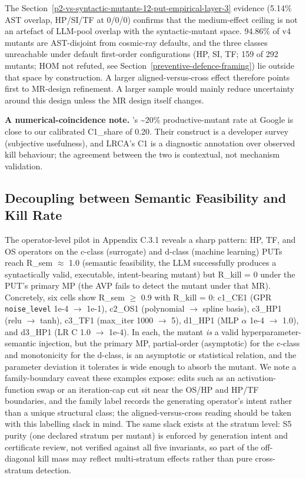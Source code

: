 \documentclass[manuscript,screen,review]{acmart}
\begin{document}
The Section~\ref{p2-vs-syntactic-mutants-12-put-empirical-layer-3} evidence (5.14\% AST overlap, HP/SI/TF at 0/0/0) confirms that
the medium-effect ceiling is not an artefact of LLM-pool overlap with
the syntactic-mutant space. 94.86\% of v4 mutants are AST-disjoint from
cosmic-ray defaults, and the three classes unreachable under default
first-order configurations (HP, SI, TF; 159 of 292 mutants; HOM not
refuted, see Section~\ref{preventive-defence-framing}) lie outside that space by construction. A
larger aligned-versus-cross effect therefore points first to MR-design
refinement. A larger sample would mainly reduce uncertainty around this
design unless the MR design itself changes.

\textbf{A numerical-coincidence note.} \citeauthor{1929c365d171c78c9c24b242b5b57e2832bc907b}'s \citeyearpar{1929c365d171c78c9c24b242b5b57e2832bc907b}
\textasciitilde20\% productive-mutant rate at Google is close to our
calibrated C1\_share of 0.20. Their construct is a developer survey
(subjective usefulness), and LRCA's C1 is a diagnostic annotation over
observed kill behaviour; the agreement between the two is contextual,
not mechanism validation.

\subsection{Decoupling between Semantic Feasibility and Kill Rate}\label{decoupling-between-r_sem-and-r_kill}

The operator-level pilot in Appendix C.3.1 reveals a sharp pattern: HP,
TF, and OS operators on the c-class (surrogate) and d-class (machine
learning) PUTs reach R\_sem $\approx$ 1.0 (semantic feasibility, the LLM
successfully produces a syntactically valid, executable, intent-bearing
mutant) but R\_kill = 0 under the PUT's primary MP (the AVP fails to
detect the mutant under that MR). Concretely, six cells show R\_sem $\geq$
0.9 with R\_kill = 0: c1\_CE1 (GPR \texttt{noise\_level} 1e-4 $\to$ 1e-1),
c2\_OS1 (polynomial $\to$ spline basis), c3\_HP1 (relu $\to$ tanh), c3\_TF1
(max\_iter 1000 $\to$ 5), d1\_HP1 (MLP $\alpha$ 1e-4 $\to$ 1.0), and d3\_HP1 (LR C 1.0
$\to$ 1e-4). In each, the mutant \emph{is} a valid hyperparameter-semantic
injection, but the primary MP, partial-order (asymptotic) for the
c-class and
monotonicity for the d-class, is an asymptotic or statistical relation,
and the parameter deviation it tolerates is wide enough to absorb the
mutant. We note a family-boundary caveat these examples expose: edits
such as an activation-function swap or an iteration-cap cut sit near
the OS/HP and HP/TF boundaries, and the family label records the
generating operator's intent rather than a unique structural class;
the aligned-versus-cross reading should be taken with this labelling
slack in mind. The same slack exists at the stratum level: S5 purity
(one declared stratum per mutant) is enforced by generation intent and
certificate review, not verified against all five invariants, so part
of the off-diagonal kill mass may reflect multi-stratum effects rather
than pure cross-stratum detection.
\end{document}
